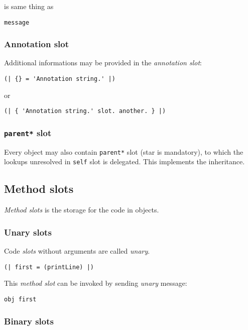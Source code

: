 \documentclass[10pt]{article}
\begin{document}
\begin{multicols*}{3}
is same thing as

\begin{lstlisting}
message
\end{lstlisting}


\subsubsection{Annotation slot}

Additional informations may be provided in the \textit{annotation slot}:

\begin{lstlisting}
(| {} = 'Annotation string.' |)
\end{lstlisting}

or

\begin{lstlisting}
(| { 'Annotation string.' slot. another. } |)
\end{lstlisting}


\subsubsection{\texttt{parent*} slot}
Every object may also contain \texttt{parent*} slot (star is mandatory), to which the lookups unresolved in \texttt{self} slot is delegated. This implements the inheritance.




\subsection{Method slots}

\textit{Method slots} is the storage for the code in objects.

\subsubsection{Unary slots}
Code \textit{slots} without arguments are called \textit{unary}.

\begin{lstlisting}
(| first = (printLine) |)
\end{lstlisting}

This \textit{method slot} can be invoked by sending \textit{unary} message:

\begin{lstlisting}
obj first
\end{lstlisting}



\subsubsection{Binary slots}


\end{multicols*}
\end{document}
